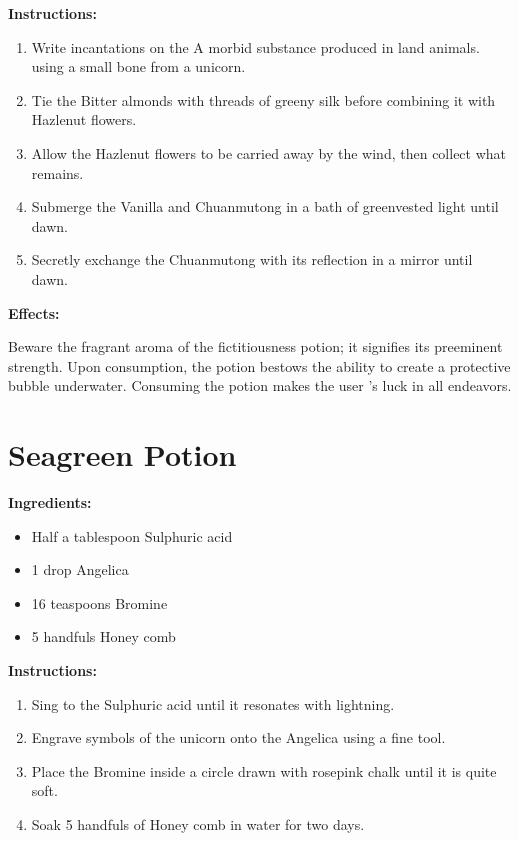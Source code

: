 \documentclass{article}
\begin{document}
\textbf{Instructions:}

\begin{enumerate}
  \item Write incantations on the A morbid substance produced in land animals. using a small bone from a unicorn.
  \item Tie the Bitter almonds with threads of greeny silk before combining it with Hazlenut flowers.
  \item Allow the Hazlenut flowers to be carried away by the wind, then collect what remains.
  \item Submerge the Vanilla and Chuanmutong in a bath of greenvested light until dawn.
  \item Secretly exchange the Chuanmutong with its reflection in a mirror until dawn.
\end{enumerate}

\textbf{Effects:}

Beware the fragrant aroma of the fictitiousness potion; it signifies its preeminent strength. Upon consumption, the potion bestows the ability to create a protective bubble underwater. Consuming the potion makes the user 's luck in all endeavors.

\newpage
\section*{Seagreen Potion}

\textbf{Ingredients:}

\begin{itemize}
  \item Half a tablespoon Sulphuric acid
  \item 1 drop Angelica
  \item 16 teaspoons Bromine
  \item 5 handfuls Honey comb
\end{itemize}

\textbf{Instructions:}

\begin{enumerate}
  \item Sing to the Sulphuric acid until it resonates with lightning.
  \item Engrave symbols of the unicorn onto the Angelica using a fine tool.
  \item Place the Bromine inside a circle drawn with rosepink chalk until it is quite soft.
  \item Soak 5 handfuls of Honey comb in water for two days.
\end{enumerate}
\end{document}
